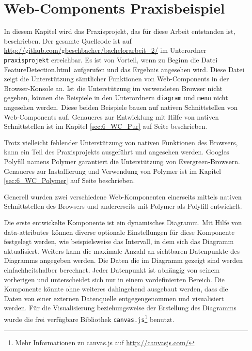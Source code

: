 \section{Web-Components Praxisbeispiel}
\label{sec:6_Web_Components_Praxis}

In diesem Kapitel wird das Praxisprojekt, das für diese Arbeit entstanden ist, beschrieben. Der gesamte Quellcode ist auf \url{http://github.com/gbeschbacher/bachelorarbeit_2/} im Unterordner \lstinline|praxisprojekt| erreichbar. Es ist von Vorteil, wenn zu Beginn die Datei \glqq FeatureDetection.html\grqq\ aufgerufen und das Ergebnis angesehen wird. Diese Datei zeigt die Unterstützung sämtlicher Funktionen von Web-Components in der Browser-Konsole an. Ist die Unterstützung im verwendeten Browser nicht gegeben, können die Beispiele in den Unterordnern \lstinline|diagram| und \lstinline|menu| nicht angesehen werden. Diese beiden Beispiele bauen auf nativen Schnittstellen von Web-Components auf. Genaueres zur Entwicklung mit Hilfe von nativen Schnittstellen ist im Kapitel \ref{sec:6_WC_Pur} auf Seite \pageref{sec:6_WC_Pur} beschrieben.

Trotz vielleicht fehlender Unterstützung von nativen Funktionen des Browsers, kann ein Teil des Praxisprojekts ausgeführt und angesehen werden. Googles Polyfill namens Polymer garantiert die Unterstützung von \glqq Evergreen\grqq -Browsern. Genaueres zur Installierung und Verwendung von Polymer ist im Kapitel \ref{sec:6_WC_Polymer} auf Seite \pageref{sec:6_WC_Polymer} beschrieben.

Generell wurden zwei verschiedene Web-Komponenten einerseits mittels nativen Schnittstellen des Browsers und andererseits mit Polymer als Polyfill entwickelt.

Die erste entwickelte Komponente ist ein dynamisches Diagramm. Mit Hilfe von \glqq data-attributes\grqq\ können diverse optionale Einstellungen für diese Komponente festgelegt werden, wie beispielsweise das Intervall, in dem sich das Diagramm aktualisiert. Weiters kann die maximale Anzahl an sichtbaren Datenpunkte des Diagramms angegeben werden. Die Daten die im Diagramm gezeigt sind werden einfachheitshalber berechnet. Jeder Datenpunkt ist abhängig von seinem vorherigen und unterscheidet sich nur in einem vordefinierten Bereich. Die Komponente könnte ohne weiteres dahingehend ausgebaut werden, dass die Daten von einer externen Datenquelle entgegengenommen und visualisiert werden. Für die Visualisierung beziehungsweise der Erstellung des Diagramms wurde die frei verfügbare Bibliothek \lstinline|canvas.js|\footnote{Mehr Informationen zu canvas.js auf \href{http://canvasjs.com/}{http://canvasjs.com/}} benutzt.

